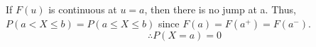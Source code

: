 \documentclass[10pt]{article}
\begin{document}
\begin{flushleft}
If $F(u)$ is continuous at $u = a$, then there is no jump at a. Thus, $P(a < X
\leq b) = P(a \leq X \leq b)$ since $F(a) = F(a^+) = F(a^-)$. 
$$\therefore P(X = a) = 0$$

\end{flushleft}
\end{document}
